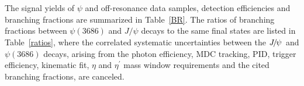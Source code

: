 \documentclass[twocolumn,showpacs,aps,prd]{revtex4-1}
\newcommand{\etap}{\eta^{\prime}}
\newcommand{\psip}{\psi(3686)}
\begin{document}
\section{}

The signal yields of $\psi$ and off-resonance data samples, detection efficiencies and branching fractions are summarized in Table~\ref{BR}.
The ratios of branching fractions between $\psip$ and $J/\psi$ decays to the same final states are listed in Table~\ref{ratios},
where the correlated systematic uncertainties between the ${J\mskip -3mu/\mskip -2mu\psi\mskip 2mu}$ and $\psip$ decays, arising from the photon efficiency, MDC tracking, PID, trigger
efficiency, kinematic fit, $\eta$ and $\etap$ mass window requirements and the cited branching fractions, are canceled.
\end{document}
